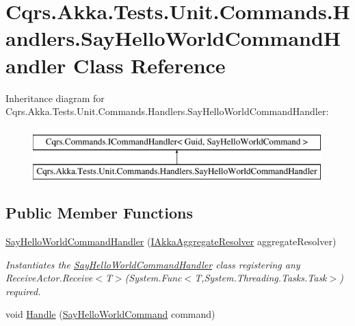 \hypertarget{classCqrs_1_1Akka_1_1Tests_1_1Unit_1_1Commands_1_1Handlers_1_1SayHelloWorldCommandHandler}{}\section{Cqrs.\+Akka.\+Tests.\+Unit.\+Commands.\+Handlers.\+Say\+Hello\+World\+Command\+Handler Class Reference}
\label{classCqrs_1_1Akka_1_1Tests_1_1Unit_1_1Commands_1_1Handlers_1_1SayHelloWorldCommandHandler}
Inheritance diagram for Cqrs.\+Akka.\+Tests.\+Unit.\+Commands.\+Handlers.\+Say\+Hello\+World\+Command\+Handler\+:\begin{figure}[H]
\begin{center}
\leavevmode
\includegraphics[height=2.000000cm]{classCqrs_1_1Akka_1_1Tests_1_1Unit_1_1Commands_1_1Handlers_1_1SayHelloWorldCommandHandler}
\end{center}
\end{figure}
\subsection*{Public Member Functions}
\begin{DoxyCompactItemize}
\item 
\hyperlink{classCqrs_1_1Akka_1_1Tests_1_1Unit_1_1Commands_1_1Handlers_1_1SayHelloWorldCommandHandler_a421fd9e6d3c9cbb5e93453675af63de0}{Say\+Hello\+World\+Command\+Handler} (\hyperlink{interfaceCqrs_1_1Akka_1_1Domain_1_1IAkkaAggregateResolver}{I\+Akka\+Aggregate\+Resolver} aggregate\+Resolver)
\begin{DoxyCompactList}\small\item\em Instantiates the \hyperlink{classCqrs_1_1Akka_1_1Tests_1_1Unit_1_1Commands_1_1Handlers_1_1SayHelloWorldCommandHandler}{Say\+Hello\+World\+Command\+Handler} class registering any Receive\+Actor.\+Receive$<$\+T$>$(\+System.\+Func$<$\+T,\+System.\+Threading.\+Tasks.\+Task$>$) required. \end{DoxyCompactList}\item 
void \hyperlink{classCqrs_1_1Akka_1_1Tests_1_1Unit_1_1Commands_1_1Handlers_1_1SayHelloWorldCommandHandler_a204e1dacbacfb172a47d1585b76ef1f4}{Handle} (\hyperlink{classCqrs_1_1Akka_1_1Tests_1_1Unit_1_1Commands_1_1SayHelloWorldCommand}{Say\+Hello\+World\+Command} command)
\end{DoxyCompactItemize}
